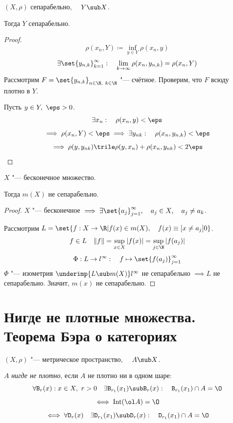 \begin{theorem}
	$ (X, \rho) $ сепарабельно, $ \quad Y \sub X $.

	Тогда $ Y $ сепарабельно.
\end{theorem}

\begin{proof}
	$$ \rho(x_n, Y) \coloneq \inf\limits_{y \in Y} \rho(x_n, y) $$
	$$ \exists \set{y_{n, k}}_{k = 1}^\infty : \quad \lim\limits_{k \to \infty} \rho(x_n, y_{n, k}) = \rho(x_n, Y) $$
	Рассмотрим $ F = \set{y_{n, k}}_{n \in \N, ~ k \in \N} $ "--- счётное.
	Проверим, что $ F $ всюду плотно в $ Y $.

	Пусть $ y \in Y, ~ \eps > 0 $.
	$$ \exists x_n : \quad \rho(x_n, y) < \eps $$
	$$ \implies \rho(x_n, Y) < \eps \implies \exists y_{n k} : \quad \rho(x_n, y_{n, k}) < \eps $$
	$$ \implies \rho(y, y_{n k}) \trile \rho(y, x_n) + \rho(x_n, y_{n k}) < 2\eps $$
\end{proof}

\begin{implication}
	$ X $ "--- бесконечное множество.

	Тогда $ m(X) $ не сепарабельно.
\end{implication}

\begin{proof}
	$ X $ "--- бесконечное $ \implies \exists \set{a_j}_{j = 1}^\infty, \quad a_j \in X, \quad a_j \ne a_k $.

	Рассмотрим $ L = \set{f : X \to \R | f(x) \in m(X), \quad f(x) \equiv[x \ne a_j] 0} $.
	$$ f \in L \quad \|f\| = \sup\limits_{x \in X} |f(x)| = \sup\limits_{j \in \N} |f(a_j)| $$
	$$ \Phi : L \to l^\infty : \quad f \mapsto \set{f(a_j)}_{j = 1}^\infty $$
	$ \Phi $ "--- изометрия $ \underimp{L \sub m(X)} l^\infty $ не сепарабельно $ \implies L $
	не сепарабельно.
	Значит, $ m(x) $ не сепарабельно.
\end{proof}

\section{Нигде не плотные множества.
Теорема Бэра о категориях}

\begin{definition}
	$ (X, \rho) $ "--- метрическое пространство, $ \quad A \sub X $.

	$ A $ \emph{нигде не плотно}, если $ A $ не плотно ни в одном шаре:
	$$ \forall \mathtt B_r(x) : x \in X, ~ r > 0 \quad \exists \mathtt B_{r_1}(x_1) \sub \mathtt B_r(x) : \quad \mathtt B_{r_1}(x_1) \cap A = \O $$
	$$ \iff \operatorname{Int}(\ol A) = \O $$
	$$ \iff \forall \mathtt D_r(x) \quad \exists \mathtt D_{r_1}(x_1) \sub \mathtt D_r(x) : \quad \mathtt D_{r_1}(x_1) \cap A = \O $$
\end{definition}

